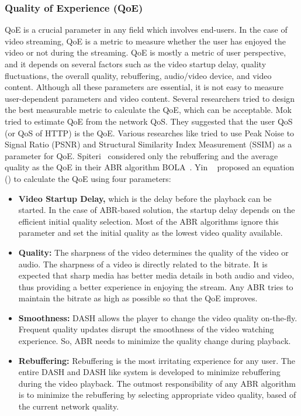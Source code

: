 \subsubsection{Quality of Experience (QoE)}
QoE is a crucial parameter in any field which involves end-users. In the case of video streaming, QoE is a metric to measure whether the user has enjoyed the video or not during the streaming. QoE is mostly a metric of user perspective, and it depends on several factors such as the video startup delay, quality fluctuations, the overall quality, rebuffering, audio/video device, and video content. Although all these parameters are essential, it is not easy to measure user-dependent parameters and video content. Several researchers tried to design the best measurable metric to calculate the QoE, which can be acceptable. Mok \etal \cite{5990550} tried to estimate QoE from the network QoS. They suggested that the user QoS (or QoS of HTTP) is the QoE. Various researches like \cite{10.1145/2155555.2155558,10.1145/3394171.3413512} tried to use Peak Noise to Signal Ratio (PSNR) and Structural Similarity Index Measurement (SSIM) as a parameter for QoE. Spiteri \etal\ considered only the rebuffering and the average quality as the QoE in their ABR algorithm BOLA~\cite{Spiteri2016}. Yin \etal~\cite{yin2015control} proposed an equation (\eqn{\ref{eqn:QoE}}) to calculate the QoE using four parameters:
\begin{itemize}
	\item {\bf Video Startup Delay,} which is the delay before the playback can be started. In the case of ABR-based solution, the startup delay depends on the efficient initial quality selection. Most of the ABR algorithms ignore this parameter and set the initial quality as the lowest video quality available.
	\item {\bf Quality:} The sharpness of the video determines the quality of the video or audio. The sharpness of a video is directly related to the bitrate. It is expected that sharp media has better media details in both audio and video, thus providing a better experience in enjoying the stream. Any ABR tries to maintain the bitrate as high as possible so that the QoE improves.
	\item {\bf Smoothness:} DASH allows the player to change the video quality on-the-fly. Frequent quality updates disrupt the smoothness of the video watching experience. So, ABR needs to minimize the quality change during playback.
	\item {\bf Rebuffering:} Rebuffering is the most irritating experience for any user. The entire DASH and DASH like system is developed to minimize rebuffering during the video playback. The outmost responsibility of any ABR algorithm is to minimize the rebuffering by selecting appropriate video quality, based of the current network quality.
\end{itemize}
